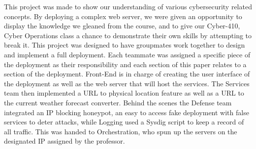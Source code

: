 This project was made to show our understanding of various cybersecurity related concepts. By deploying a complex web server, we were given an opportunity to display the knowledge we gleaned from the course, and to give our Cyber-410, Cyber Operations class a chance to demonstrate their own skills by attempting to break it. This project was designed to have groupmates work together to design and implement a full deployment. Each teammate was assigned a specific piece of the deployment as their responsibility and each section of this paper relates to a section of the deployment. Front-End is in charge of creating the user interface of the deployment as well as the web server that will host the services. The Services team then implemented a URL to physical location feature as well as a URL to the current weather forecast converter. Behind the scenes the Defense team integrated an IP blocking honeypot, an easy to access fake deployment with false services \cite{nawrocki2016survey} to deter attacks, while Logging used a Sysdig script to keep a record of all traffic. This was handed to Orchestration, who spun up the servers on the designated IP assigned by the professor. 
